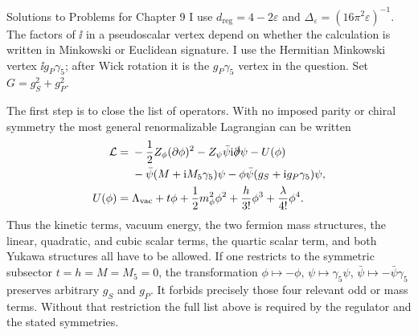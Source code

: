 \begin{bankssolutions}{Solutions to Problems for Chapter 9}
I use $d_{\mathrm{reg}}=4-2\varepsilon$ and
$\Delta_\varepsilon=(16\pi^2\varepsilon)^{-1}$.  The factors of $\ii$ in a
pseudoscalar vertex depend on whether the calculation is written in
Minkowski or Euclidean signature.  I use the Hermitian Minkowski vertex
$\ii g_P\gamma _5$; after Wick rotation it is the $g_P\gamma _5$ vertex in
the question.  Set $G=g_S^2+g_P^2$.

The first step is to close the list of operators.  With no imposed parity or
chiral symmetry the most general renormalizable Lagrangian can be written
\begin{align*}
 \mathcal L={}&-\frac12 Z_\phi(\partial\phi)^2
 -Z_\psi\bar\psi\mathrm{i}\slashed\partial\psi-U(\phi)\\
 &-\bar\psi(M+\mathrm{i} M_5\gamma _5)\psi
 -\phi\bar\psi(g_S+\mathrm{i} g_P\gamma _5)\psi ,\\
 U(\phi)={}&\Lambda_{\rm vac}+t\phi+\frac12m_\phi^2\phi^2
       +\frac{h}{3!}\phi^3+\frac{\lambda}{4!}\phi^4 .
\end{align*}
Thus the kinetic terms, vacuum energy, the two fermion mass structures, the
linear, quadratic, and cubic scalar terms, the quartic scalar term, and both
Yukawa structures all have to be allowed.  If one restricts to the symmetric
subsector $t=h=M=M_5=0$, the transformation
$\phi\mapsto-\phi$, $\psi\mapsto\gamma _5\psi$,
$\bar\psi\mapsto-\bar\psi\gamma _5$ preserves arbitrary $g_S$ and $g_P$.
It forbids precisely those four relevant odd or mass terms.  Without that
restriction the full list above is required by the regulator and the stated
symmetries.


\end{bankssolutions}
